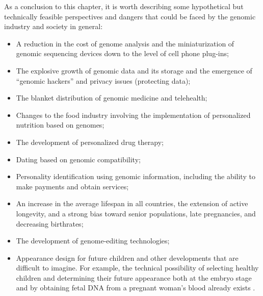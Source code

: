 As a conclusion to this chapter, it is worth describing some hypothetical but technically feasible perspectives and dangers that could be faced by the genomic industry and society in general:
\begin{itemize}

  \item A reduction in the cost of genome analysis and the miniaturization of genomic sequencing devices %
    down to the level of cell phone plug-ins;
  \item The explosive growth of genomic data and its storage and the emergence of “genomic hackers” and privacy issues (protecting data);
  \item The blanket distribution of genomic medicine and telehealth;
  \item Changes to the food industry involving the implementation of personalized nutrition based on genomes;
  \item The development of personalized drug therapy;
  \item Dating based on genomic compatibility;
  \item Personality identification using genomic information, including the ability to make payments and obtain services;
  \item An increase in the average lifespan in all countries, the extension of active longevity, and a strong bias toward senior populations, late pregnancies, and decreasing birthrates;
  \item The development of genome-editing technologies;
  \item Appearance design for future children and other developments that are difficult to imagine. For example, the technical possibility of selecting healthy children and determining their future appearance both at the embryo stage and by obtaining fetal DNA from a pregnant woman’s blood already exists \cite{wired.co.uk:longevitydiseases}.
\end{itemize}
